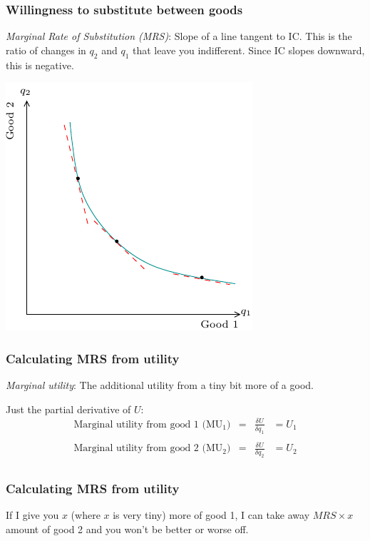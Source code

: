 \documentclass[xcolor=pdftex,dvipsnames]{beamer}
\begin{document}
\begin{frame}\frametitle{Willingness to substitute between goods}
 \emph{Marginal Rate of Substitution (MRS)}: Slope of a line tangent
 to IC. This is the ratio of changes in $q_2$ and $q_1$ that leave you
 indifferent. Since IC slopes downward, this is negative.
\begin{center}
  \includegraphics[scale=0.8]{pics/MRS}
\end{center}



\end{frame}

\begin{frame}\frametitle{Calculating MRS from utility}
\emph{Marginal utility}: The additional utility from a tiny bit more
of a good.

Just the partial derivative of $U$:
\[
\begin{array}{rclcl}
\text{Marginal utility from good 1 ($\text{MU}_1)$} & = & \frac{\delta U}{\delta q_1}&=U_1\\\\
\text{Marginal utility from good 2 ($\text{MU}_2$)} & = & \frac{\delta U}{\delta q_2}&=U_2\\
\end{array}
\]


\end{frame}

\begin{frame}\frametitle{Calculating MRS from utility}
If I give you $x$ (where $x$ is very tiny) more of good 1, I can take away
$MRS\times x$ amount of good 2 and you won't be better or worse off.
\bigskip



\end{frame}
\end{document}
